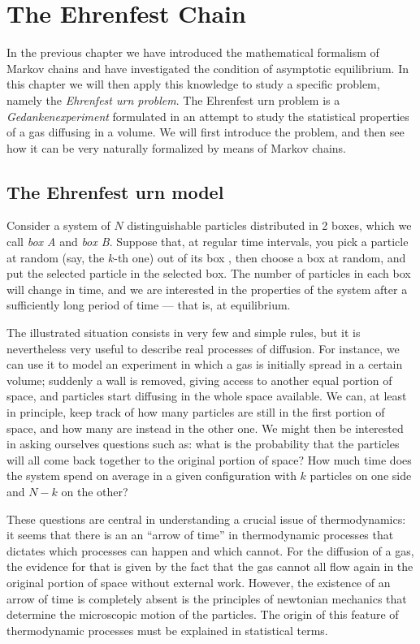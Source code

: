 \chapter{The Ehrenfest Chain} \label{ch:3}
In the previous chapter we have introduced the mathematical formalism of Markov chains and have investigated the condition of asymptotic equilibrium. In this chapter we will then apply this knowledge to study a specific problem, namely the \emph{Ehrenfest urn problem}. The Ehrenfest urn problem is a \emph{Gedankenexperiment} formulated in an attempt to study the statistical properties of a gas diffusing in a volume. We will first introduce the problem, and then see how it can be very naturally formalized by means of Markov chains.

\section{The Ehrenfest urn model}
Consider a system of $N$ distinguishable particles distributed in 2 boxes, which we call \emph{box A} and \emph{box B}. Suppose that, at regular time intervals, you pick a particle at random (say, the $k$-th one) out of its box , then choose a box at random, and put the selected particle in the selected box. The number of particles in each box will change in time, and we are interested in the properties of the system after a sufficiently long period of time --- that is, at equilibrium.

The illustrated situation consists in very few and simple rules, but it is nevertheless very useful to describe real processes of diffusion. For instance, we can use it to model an experiment in which a gas is initially spread in a certain volume; suddenly a wall is removed, giving access to another equal portion of space, and particles start diffusing in the whole space available. We can, at least in principle, keep track of how many particles are still in the first portion of space, and how many are instead in the other one. We might then be interested in asking ourselves questions such as: what is the probability that the particles will all come back together to the original portion of space? How much time does the system spend on average in a given configuration with $k$ particles on one side and $N - k$ on the other? 

These questions are central in understanding a crucial issue of thermodynamics: it seems that there is an an \enquote{arrow of time} in thermodynamic processes that dictates which processes can happen and which cannot. For the diffusion of a gas, the evidence for that is given by the fact that the gas cannot all flow again in the original portion of space without external work. However, the existence of an arrow of time is completely absent is the principles of newtonian mechanics that determine the microscopic motion of the particles. The origin of this feature of thermodynamic processes must be explained in statistical terms.

